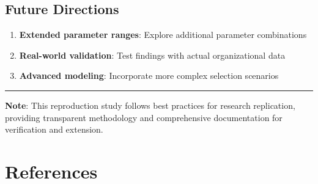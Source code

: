 \documentclass[
]{article}
\providecommand{\tightlist}{%
  \setlength{\itemsep}{0pt}\setlength{\parskip}{0pt}}
\begin{document}
\subsection{Future Directions}\label{future-directions}

\begin{enumerate}
\def\labelenumi{\arabic{enumi}.}
\tightlist
\item
  \textbf{Extended parameter ranges}: Explore additional parameter
  combinations
\item
  \textbf{Real-world validation}: Test findings with actual
  organizational data
\item
  \textbf{Advanced modeling}: Incorporate more complex selection
  scenarios
\end{enumerate}

\begin{center}\rule{0.5\linewidth}{0.5pt}\end{center}

\textbf{Note}: This reproduction study follows best practices for
research replication, providing transparent methodology and
comprehensive documentation for verification and extension.

\section{References}\label{references}
\end{document}
